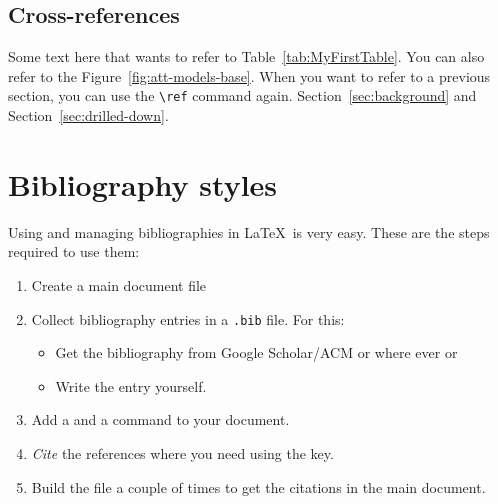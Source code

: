 \documentclass{styles/llncs}
\begin{document}
\subsection{Cross-references} 
Some text here that wants to refer to Table~\ref{tab:MyFirstTable}. You can also refer to the Figure~\ref{fig:att-models-base}. When you want to refer to a previous section, you can use the \verb|\ref| command again. Section~\ref{sec:background} and Section~\ref{sec:drilled-down}. 

 

\section{Bibliography styles} 
Using and managing bibliographies in \LaTeX\ is very easy. These are the steps required to use them: 

\begin{enumerate}
	\item Create a main document file 
	\item Collect bibliography entries in a \verb|.bib| file. For this: 
	\begin{itemize}
		\item Get the bibliography from Google Scholar/ACM or where ever or 
		\item Write the entry yourself. 
	\end{itemize}
	\item Add a \verb|| and a \verb|| command to your document. 
	\item \emph{Cite} the references where you need using the key. 
	\item Build the file a couple of times to get the citations in the main document. 
\end{enumerate}
\end{document}
